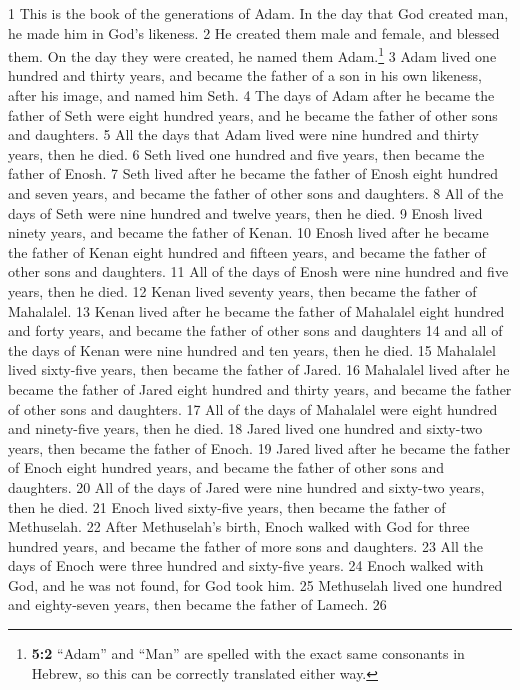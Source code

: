 {1} This is the book of the generations of Adam. In the day that God
created man, he made him in God's likeness. {2} He created them male and
female, and blessed them. On the day they were created, he named them
Adam.\footnote{\textbf{5:2} ``Adam'' and ``Man'' are spelled with the
  exact same consonants in Hebrew, so this can be correctly translated
  either way.} {3} Adam lived one hundred and thirty years, and became
the father of a son in his own likeness, after his image, and named him
Seth. {4} The days of Adam after he became the father of Seth were eight
hundred years, and he became the father of other sons and daughters. {5}
All the days that Adam lived were nine hundred and thirty years, then he
died. {6} Seth lived one hundred and five years, then became the father
of Enosh. {7} Seth lived after he became the father of Enosh eight
hundred and seven years, and became the father of other sons and
daughters. {8} All of the days of Seth were nine hundred and twelve
years, then he died. {9} Enosh lived ninety years, and became the father
of Kenan. {10} Enosh lived after he became the father of Kenan eight
hundred and fifteen years, and became the father of other sons and
daughters. {11} All of the days of Enosh were nine hundred and five
years, then he died. {12} Kenan lived seventy years, then became the
father of Mahalalel. {13} Kenan lived after he became the father of
Mahalalel eight hundred and forty years, and became the father of other
sons and daughters {14} and all of the days of Kenan were nine hundred
and ten years, then he died. {15} Mahalalel lived sixty-five years, then
became the father of Jared. {16} Mahalalel lived after he became the
father of Jared eight hundred and thirty years, and became the father of
other sons and daughters. {17} All of the days of Mahalalel were eight
hundred and ninety-five years, then he died. {18} Jared lived one
hundred and sixty-two years, then became the father of Enoch. {19} Jared
lived after he became the father of Enoch eight hundred years, and
became the father of other sons and daughters. {20} All of the days of
Jared were nine hundred and sixty-two years, then he died. {21} Enoch
lived sixty-five years, then became the father of Methuselah. {22} After
Methuselah's birth, Enoch walked with God for three hundred years, and
became the father of more sons and daughters. {23} All the days of Enoch
were three hundred and sixty-five years. {24} Enoch walked with God, and
he was not found, for God took him. {25} Methuselah lived one hundred
and eighty-seven years, then became the father of Lamech. {26}
